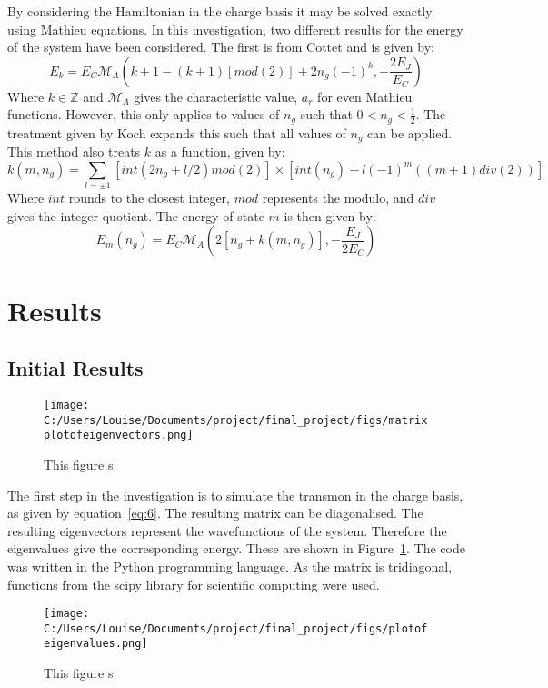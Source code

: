 \documentclass[11pt]{article}
\begin{document}
By considering the Hamiltonian in the charge basis it may be solved exactly using Mathieu equations. In this investigation, two different results for the energy of the system have been considered. The first is from Cottet and is given by:
\begin{equation} \label{eq:7}
E_k = E_C \mathcal{M}_A (k+1 - (k+1)[mod(2)] + 2n_g(-1)^k, -\frac{2E_J}{E_C})
\end{equation}
Where $k \in \mathbb{Z}$ and $\mathcal{M}_A$ gives the characteristic value, $a_r$ for even Mathieu functions. However, this only applies to values of $n_g$ such that $0 < n_g < \frac{1}{2}$. The treatment given by Koch expands this such that all values of $n_g$ can be applied. This method also treats $k$ as a function, given by:
\begin{equation} \label{eq:8}
k(m, n_g) = \sum_{l=\pm 1} [int(2n_g + l/2)mod(2)] \times [int(n_g) + l(-1)^m ((m+1)div(2))]
\end{equation}
Where $int$ rounds to the closest integer, $mod$ represents the modulo, and $div$ gives the integer quotient.  The energy of state $m$ is then given by:
\begin{equation} \label{eq:9}
E_m(n_g) = E_C \mathcal{M}_A (2[n_g + k(m,n_g)],-\frac{E_J}{2E_C})
\end{equation}


\section{Results}
\subsection{Initial Results}

\begin{figure}[ht]
\centering
\texttt{[image: C:/Users/Louise/Documents/project/final\_project/figs/matrixplotofeigenvectors.png]}
\caption{This figure s}
\label{fig:graph1}
\end{figure}
The first step in the investigation is to simulate the transmon in the charge basis, as given by equation~\ref{eq:6}. The resulting matrix can be diagonalised. The resulting eigenvectors represent the wavefunctions of the system. Therefore the eigenvalues give the corresponding energy. These are shown in Figure~\ref{fig:graph1}. The code was written in the Python programming language. As the matrix is tridiagonal, functions from the scipy library for scientific computing were used.
\begin{figure}[ht]
\centering
\texttt{[image: C:/Users/Louise/Documents/project/final\_project/figs/plotofeigenvalues.png]}
\caption{This figure s}
\label{fig:graph2}
\end{figure}
\end{document}
